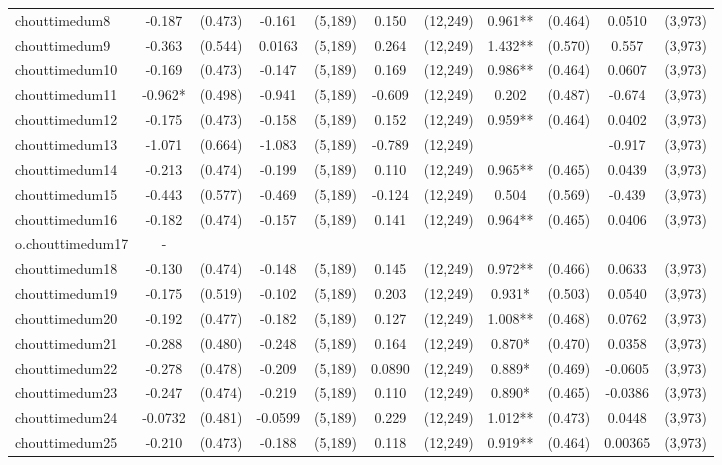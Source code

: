 \documentclass[]{article}
\begin{document}
\begin{tabular}{lcccccccccc}
chouttimedum8 & -0.187 & (0.473) & -0.161 & (5,189) & 0.150 & (12,249) & 0.961** & (0.464) & 0.0510 & (3,973) \\
chouttimedum9 & -0.363 & (0.544) & 0.0163 & (5,189) & 0.264 & (12,249) & 1.432** & (0.570) & 0.557 & (3,973) \\
chouttimedum10 & -0.169 & (0.473) & -0.147 & (5,189) & 0.169 & (12,249) & 0.986** & (0.464) & 0.0607 & (3,973) \\
chouttimedum11 & -0.962* & (0.498) & -0.941 & (5,189) & -0.609 & (12,249) & 0.202 & (0.487) & -0.674 & (3,973) \\
chouttimedum12 & -0.175 & (0.473) & -0.158 & (5,189) & 0.152 & (12,249) & 0.959** & (0.464) & 0.0402 & (3,973) \\
chouttimedum13 & -1.071 & (0.664) & -1.083 & (5,189) & -0.789 & (12,249) &  &  & -0.917 & (3,973) \\
chouttimedum14 & -0.213 & (0.474) & -0.199 & (5,189) & 0.110 & (12,249) & 0.965** & (0.465) & 0.0439 & (3,973) \\
chouttimedum15 & -0.443 & (0.577) & -0.469 & (5,189) & -0.124 & (12,249) & 0.504 & (0.569) & -0.439 & (3,973) \\
chouttimedum16 & -0.182 & (0.474) & -0.157 & (5,189) & 0.141 & (12,249) & 0.964** & (0.465) & 0.0406 & (3,973) \\
o.chouttimedum17 & - &  &  &  &  &  &  &  &  &  \\
chouttimedum18 & -0.130 & (0.474) & -0.148 & (5,189) & 0.145 & (12,249) & 0.972** & (0.466) & 0.0633 & (3,973) \\
chouttimedum19 & -0.175 & (0.519) & -0.102 & (5,189) & 0.203 & (12,249) & 0.931* & (0.503) & 0.0540 & (3,973) \\
chouttimedum20 & -0.192 & (0.477) & -0.182 & (5,189) & 0.127 & (12,249) & 1.008** & (0.468) & 0.0762 & (3,973) \\
chouttimedum21 & -0.288 & (0.480) & -0.248 & (5,189) & 0.164 & (12,249) & 0.870* & (0.470) & 0.0358 & (3,973) \\
chouttimedum22 & -0.278 & (0.478) & -0.209 & (5,189) & 0.0890 & (12,249) & 0.889* & (0.469) & -0.0605 & (3,973) \\
chouttimedum23 & -0.247 & (0.474) & -0.219 & (5,189) & 0.110 & (12,249) & 0.890* & (0.465) & -0.0386 & (3,973) \\
chouttimedum24 & -0.0732 & (0.481) & -0.0599 & (5,189) & 0.229 & (12,249) & 1.012** & (0.473) & 0.0448 & (3,973) \\
chouttimedum25 & -0.210 & (0.473) & -0.188 & (5,189) & 0.118 & (12,249) & 0.919** & (0.464) & 0.00365 & (3,973) \\

\end{tabular}
\end{document}
